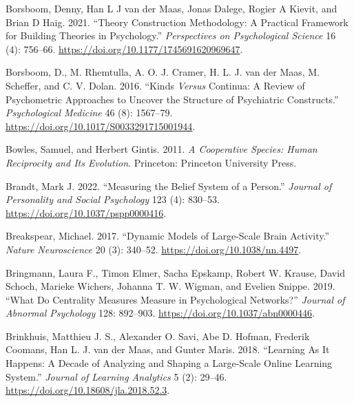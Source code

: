 \documentclass[
  a4paper,
  DIV=11,
  numbers=noendperiod]{scrreprt}
\newlength{\cslhangindent}
\newlength{\cslentryspacingunit} %
\newenvironment{CSLReferences}[2] %
 {%
  \setlength{\parindent}{0pt}
  \ifodd #1
  \let\oldpar\par
  \def\par{\hangindent=\cslhangindent\oldpar}
  \fi
  \setlength{\parskip}{#2\cslentryspacingunit}
 }%
 {}
\begin{document}
\begin{CSLReferences}{1}{0}
\leavevmode{}%
Borsboom, Denny, Han L J van der Maas, Jonas Dalege, Rogier A Kievit,
and Brian D Haig. 2021. {``Theory {Construction Methodology}: {A
Practical Framework} for {Building Theories} in {Psychology}.''}
\emph{Perspectives on Psychological Science} 16 (4): 756--66.
\url{https://doi.org/10.1177/1745691620969647}.

\leavevmode{}%
Borsboom, D., M. Rhemtulla, A. O. J. Cramer, H. L. J. van der Maas, M.
Scheffer, and C. V. Dolan. 2016. {``Kinds {\emph{Versus}} Continua: A
Review of Psychometric Approaches to Uncover the Structure of
Psychiatric Constructs.''} \emph{Psychological Medicine} 46 (8):
1567--79. \url{https://doi.org/10.1017/S0033291715001944}.

\leavevmode{}%
Bowles, Samuel, and Herbert Gintis. 2011. \emph{A Cooperative Species:
Human Reciprocity and Its Evolution}. {Princeton}: {Princeton University
Press}.

\leavevmode{}%
Brandt, Mark J. 2022. {``Measuring the Belief System of a Person.''}
\emph{Journal of Personality and Social Psychology} 123 (4): 830--53.
\url{https://doi.org/10.1037/pspp0000416}.

\leavevmode{}%
Breakspear, Michael. 2017. {``Dynamic Models of Large-Scale Brain
Activity.''} \emph{Nature Neuroscience} 20 (3): 340--52.
\url{https://doi.org/10.1038/nn.4497}.

\leavevmode{}%
Bringmann, Laura F., Timon Elmer, Sacha Epskamp, Robert W. Krause, David
Schoch, Marieke Wichers, Johanna T. W. Wigman, and Evelien Snippe. 2019.
{``What Do Centrality Measures Measure in Psychological Networks?''}
\emph{Journal of Abnormal Psychology} 128: 892--903.
\url{https://doi.org/10.1037/abn0000446}.

\leavevmode{}%
Brinkhuis, Matthieu J. S., Alexander O. Savi, Abe D. Hofman, Frederik
Coomans, Han L. J. van der Maas, and Gunter Maris. 2018. {``Learning {As
It Happens}: {A Decade} of {Analyzing} and {Shaping} a {Large-Scale
Online Learning System}.''} \emph{Journal of Learning Analytics} 5 (2):
29--46. \url{https://doi.org/10.18608/jla.2018.52.3}.


\end{CSLReferences}
\end{document}
